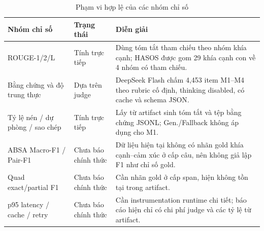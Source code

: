 \documentclass[12pt,a4paper]{report}
\begin{document}
\begin{table}[tbp]
\centering
\caption{Phạm vi hợp lệ của các nhóm chỉ số}
\label{tab:metric-availability}
\begin{tabularx}{\textwidth}{L{0.23\textwidth} L{0.20\textwidth} Y}
\toprule
\textbf{Nhóm chỉ số} & \textbf{Trạng thái} & \textbf{Diễn giải} \\
\midrule
ROUGE-1/2/L & Tính trực tiếp & Dùng tóm tắt tham chiếu theo nhóm khía cạnh; HASOS được gom 29 khía cạnh con về 4 nhóm có tham chiếu. \\
Bằng chứng và độ trung thực & Dựa trên judge & DeepSeek Flash chấm 4,453 item M1--M4 theo rubric cố định, thinking disabled, có cache và schema JSON. \\
Tỷ lệ nén / dự phòng / sao chép & Tính trực tiếp & Lấy từ artifact sinh tóm tắt và tệp bằng chứng JSONL; Gen./Fallback không áp dụng cho M1. \\
ABSA Macro-F1 / Pair-F1 & Chưa báo chính thức & Dữ liệu hiện tại không có nhãn gold khía cạnh--cảm xúc ở cấp câu, nên không giả lập F1 như chỉ số gold. \\
Quad exact/partial F1 & Chưa báo chính thức & Cần nhãn gold ở cấp span, hiện không tồn tại trong artifact. \\
p95 latency / cache / retry & Chưa báo chính thức & Cần instrumentation runtime chi tiết; báo cáo hiện chỉ có chi phí judge và các tỷ lệ từ artifact. \\
\bottomrule
\end{tabularx}
\end{table}
\end{document}
